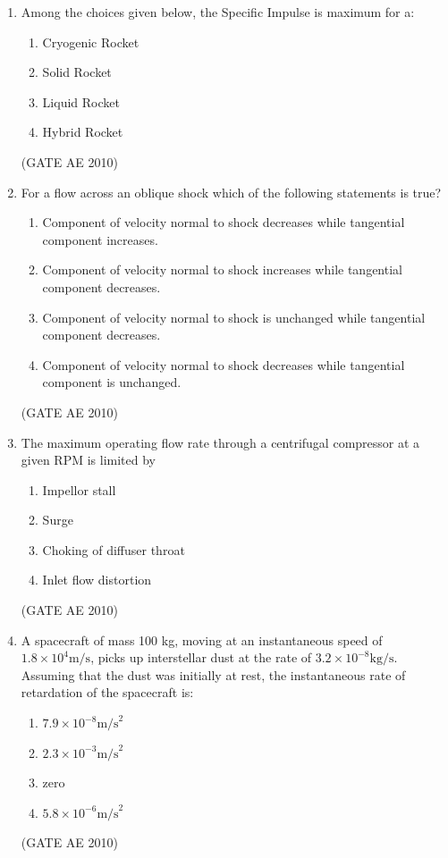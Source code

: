 \documentclass[journal]{IEEEtran}
\begin{document}
\begin{enumerate}
\item Among the choices given below, the Specific Impulse is maximum for a:

\begin{multicols}{2}
\begin{enumerate}
\item Cryogenic Rocket  
\item Solid Rocket  
\item Liquid Rocket  
\item Hybrid Rocket  
\end{enumerate}
\end{multicols}
\hfill (GATE AE 2010)

\item For a flow across an oblique shock which of the following statements is true?
\begin{enumerate}
\item Component of velocity normal to shock decreases while tangential component increases.
\item Component of velocity normal to shock increases while tangential component decreases.
\item Component of velocity normal to shock is unchanged while tangential component decreases.
\item Component of velocity normal to shock decreases while tangential component is unchanged.
\end{enumerate}
\hfill (GATE AE 2010)

\item The maximum operating flow rate through a centrifugal compressor at a given RPM is limited by
\begin{multicols}{2}
\begin{enumerate}
\item Impellor stall
\item Surge
\item Choking of diffuser throat
\item Inlet flow distortion
\end{enumerate}
\end{multicols}
\hfill (GATE AE 2010)

\item A spacecraft of mass 100 kg, moving at an instantaneous speed of $1.8 \times 10^4  \text{m/s}$, picks up interstellar dust at the rate of $3.2 \times 10^{-8}  \text{kg/s}$. Assuming that the dust was initially at rest, the instantaneous rate of retardation of the spacecraft is:
\begin{multicols}{4}
\begin{enumerate}
\item $7.9 \times 10^{-8}  \text{m/s}^2$
\item $2.3 \times 10^{-3}  \text{m/s}^2$
\item zero
\item $5.8 \times 10^{-6}  \text{m/s}^2$
\end{enumerate}
\end{multicols}
\hfill (GATE AE 2010)


\end{enumerate}
\end{document}
